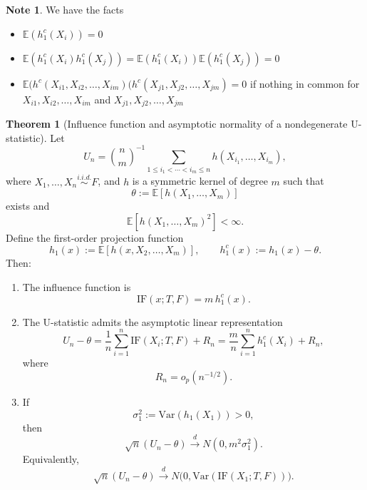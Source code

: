 \documentclass[11pt]{article}
\theoremstyle{definition}
\newtheorem{note}{Note}[section]
\newtheorem{theo}{Theorem}[section]
\begin{document}
\begin{note} We have the facts
    \begin{itemize}
    \item $\mathbb{E}(h^c_1(X_i)) = 0$
    \item $\mathbb{E}(h^c_1(X_i)h^c_1(X_j)) = \mathbb{E}(h^c_1(X_i))\mathbb{E}(h^c_1(X_j)) = 0$
    \item $\mathbb{E}(h^c(X_{i1}, X_{i2},\dots,X_{im})(h^c(X_{j1}, X_{j2},\dots,X_{jm}) = 0$ if nothing in common for $X_{i1}, X_{i2},\dots,X_{im}$ and $X_{j1}, X_{j2},\dots,X_{jm}$
\end{itemize}
\end{note}

\begin{theo}[Influence function and asymptotic normality of a nondegenerate U-statistic]
Let
\[
U_n
=
\binom{n}{m}^{-1}
\sum_{1\le i_1<\cdots<i_m\le n}
h(X_{i_1},\dots,X_{i_m}),
\]
where $X_1,\dots,X_n \overset{i.i.d.}{\sim} F$, and $h$ is a symmetric kernel of degree $m$ such that
\[
\theta := \mathbb{E}[h(X_1,\dots,X_m)]
\]
exists and
\[
\mathbb{E}[h(X_1,\dots,X_m)^2] < \infty.
\]
Define the first-order projection function
\[
h_1(x) := \mathbb{E}[h(x,X_2,\dots,X_m)],
\qquad
h_1^c(x) := h_1(x)-\theta.
\]
Then:

\begin{enumerate}
\item The influence function is
\[
\mathrm{IF}(x;T,F)=m\,h_1^c(x).
\]

\item The U-statistic admits the asymptotic linear representation
\[
U_n-\theta
=
\frac{1}{n}\sum_{i=1}^n \mathrm{IF}(X_i;T,F) + R_n
=
\frac{m}{n}\sum_{i=1}^n h_1^c(X_i)+R_n,
\]
where
\[
R_n=o_p(n^{-1/2}).
\]

\item If
\[
\sigma_1^2 := \mathrm{Var}(h_1(X_1))>0,
\]
then
\[
\sqrt{n}(U_n-\theta)\xrightarrow{d}N(0,m^2\sigma_1^2).
\]
Equivalently,
\[
\sqrt{n}(U_n-\theta)\xrightarrow{d}N\bigl(0,\mathrm{Var}(\mathrm{IF}(X_1;T,F))\bigr).
\]
\end{enumerate}
\end{theo}
\end{document}
